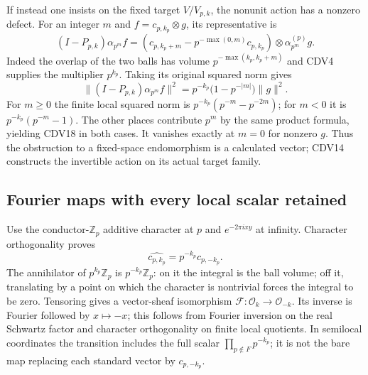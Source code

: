 \documentclass[11pt,a4paper]{article}
\theoremstyle{definition}\newtheorem{definition}[theorem]{Definition}
\begin{document}
If instead one insists on the fixed target $V/V_{p,k}$, the
nonunit action has a nonzero defect. For an integer $m$ and
$f=c_{p,k_p}\otimes g$, its representative is
\begin{equation}\tag{CDV17}
 (I-P_{p,k})\alpha_{p^m}f
 =\left(c_{p,k_p+m}-p^{-\max(0,m)}c_{p,k_p}\right)
                        \otimes\alpha_{p^m}^{(p)}g.
\end{equation}
Indeed the overlap of the two balls has volume
$p^{-\max(k_p,k_p+m)}$ and CDV4 supplies the multiplier
$p^{k_p}$. Taking its original squared norm gives
\begin{equation}\tag{CDV18}
 \|(I-P_{p,k})\alpha_{p^m}f\|^2
 =p^{-k_p}\bigl(1-p^{-|m|}\bigr)\|g\|^2.
\end{equation}
For $m\ge0$ the finite local squared norm is
$p^{-k_p}(p^{-m}-p^{-2m})$; for $m<0$ it is
$p^{-k_p}(p^{-m}-1)$. The other places contribute $p^m$
by the same product formula, yielding CDV18 in both cases.
It vanishes exactly at $m=0$ for nonzero $g$. Thus the
obstruction to a fixed-space endomorphism is a calculated vector;
CDV14 constructs the invertible action on its actual target family.

\subsection{Fourier maps with every local scalar retained}

Use the conductor-$\mathbb Z_p$ additive character at $p$ and
$e^{-2\pi ixy}$ at infinity. Character orthogonality proves
\begin{equation}\tag{CDV19}
 \widehat{c_{p,k_p}}=p^{-k_p}c_{p,-k_p}.
\end{equation}
The annihilator of $p^{k_p}\mathbb Z_p$ is
$p^{-k_p}\mathbb Z_p$: on it the integral is the ball volume;
off it, translating by a point on which the character is nontrivial
forces the integral to be zero. Tensoring gives a vector-sheaf
isomorphism $\mathcal F:\mathcal O_k\to\mathcal O_{-k}$.
Its inverse is Fourier followed by $x\mapsto-x$; this follows
from Fourier inversion on the real Schwartz factor and character
orthogonality on finite local quotients. In semilocal coordinates
the transition includes the full scalar
$\prod_{p\notin F}p^{-k_p}$; it is not the bare map replacing
each standard vector by $c_{p,-k_p}$.
\end{document}
